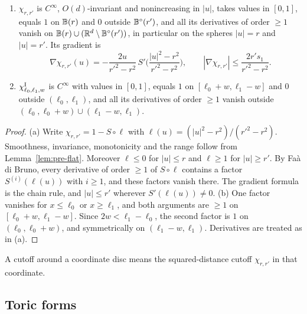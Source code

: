 \begin{lemma}[Cutoffs]\label{lem:pre-cutoff}
\begin{enumerate}[label=(\alph*)]
\item $\chi_{r,r'}$ is $C^\infty$, $O(d)$-invariant and nonincreasing in $|u|$, takes values in $[0,1]$, equals $1$
on $\mathbb{B}(r)$ and $0$ outside $\mathbb{B}^\circ(r')$, and all its derivatives of order $\ge1$ vanish on
$\mathbb{B}(r)\cup(\mathbb{R}^d\setminus\mathbb{B}^\circ(r'))$, in particular on the spheres $|u|=r$ and $|u|=r'$. Its gradient is
\[
 \nabla\chi_{r,r'}(u)=-\frac{2u}{r'^2-r^2}\,S'\Big(\frac{|u|^2-r^2}{r'^2-r^2}\Big),\qquad
 |\nabla\chi_{r,r'}|\le\frac{2r's_1}{r'^2-r^2}.
\]
\item $\chi^{\rm I}_{\ell_0,\ell_1,w}$ is $C^\infty$ with values in $[0,1]$, equals $1$ on $[\ell_0+w,\ell_1-w]$ and $0$ outside
$(\ell_0,\ell_1)$, and all its derivatives of order $\ge1$ vanish outside $(\ell_0,\ell_0+w)\cup(\ell_1-w,\ell_1)$.
\end{enumerate}
\end{lemma}

\begin{proof}
(a) Write $\chi_{r,r'}=1-S\circ\ell$ with $\ell(u)=(|u|^2-r^2)/(r'^2-r^2)$. Smoothness, invariance, monotonicity and the range follow from Lemma~\ref{lem:pre-flat}. Moreover $\ell\le0$ for $|u|\le r$ and $\ell\ge1$ for $|u|\ge r'$. By Fa\`a di Bruno, every derivative of order $\ge1$ of $S\circ\ell$ contains a factor $S^{(i)}(\ell(u))$ with $i\ge1$, and these factors vanish there. The gradient formula is the chain rule, and $|u|\le r'$ wherever $S'(\ell(u))\ne0$.
(b) One factor vanishes for $x\le\ell_0$ or $x\ge\ell_1$, and both arguments are $\ge1$ on $[\ell_0+w,\ell_1-w]$. Since $2w<\ell_1-\ell_0$, the second factor is $1$ on $(\ell_0,\ell_0+w)$, and symmetrically on $(\ell_1-w,\ell_1)$. Derivatives are treated as in (a).
\end{proof}

A cutoff around a coordinate disc means the squared-distance cutoff $\chi_{r,r'}$ in that coordinate.

\subsection{Toric forms}\label{sec:pre-toric}

